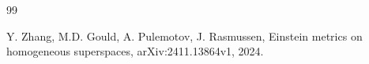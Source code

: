 \documentclass[reqno]{amsart}
\theoremstyle{definition}
\begin{document}
\begin{thebibliography}{99}














 Y. Zhang, M.D. Gould, A. Pulemotov, J. Rasmussen, Einstein metrics on homogeneous superspaces,
arXiv:2411.13864v1, 2024.


\end{thebibliography}
\end{document}
